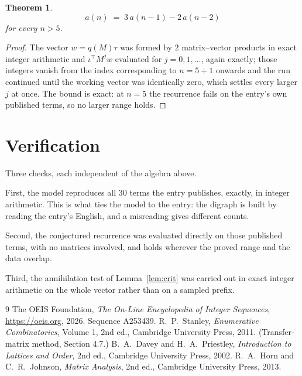 \documentclass[11pt,a4paper]{article}
\theoremstyle{plain}
\newtheorem{theorem}{Theorem}
\theoremstyle{definition}
\begin{document}
\begin{theorem}
\[
a(n)\;=\;3\,a(n-1) - 2\,a(n-2)
\]
for every $n>5$.
\end{theorem}

\begin{proof}
The vector $w=q(M)\tau$ was formed by $2$ matrix--vector products in exact integer
arithmetic and $\iota^{\!\top}M^{j}w$ evaluated for $j=0,1,\dots$, again exactly; those
integers vanish from the index corresponding to $n=5+1$ onwards and the run continued
until the working vector was identically zero, which settles every larger $j$ at once. The bound is exact: at $n=5$ the recurrence fails on the entry's own published terms, so no larger range holds.
\end{proof}

\section{Verification}

Three checks, each independent of the algebra above.

First, the model reproduces all $30$ terms the entry publishes, exactly, in integer
arithmetic. This is what ties the model to the entry: the digraph is built by reading the
entry's English, and a misreading gives different counts.

Second, the conjectured recurrence was evaluated directly on those published terms, with no
matrices involved, and holds wherever the proved range and the data overlap.

Third, the annihilation test of Lemma~\ref{lem:crit} was carried out in exact integer
arithmetic on the whole vector rather than on a sampled prefix.

\begin{thebibliography}{9}
 The OEIS Foundation, \emph{The On-Line Encyclopedia of Integer
Sequences}, \url{https://oeis.org}, 2026. Sequence A253439.
 R.~P.~Stanley, \emph{Enumerative Combinatorics}, Volume 1, 2nd ed.,
Cambridge University Press, 2011. (Transfer-matrix method, Section 4.7.)
 B.~A.~Davey and H.~A.~Priestley, \emph{Introduction to Lattices and
Order}, 2nd ed., Cambridge University Press, 2002.
 R.~A.~Horn and C.~R.~Johnson, \emph{Matrix Analysis}, 2nd ed., Cambridge
University Press, 2013.
\end{thebibliography}
\end{document}
